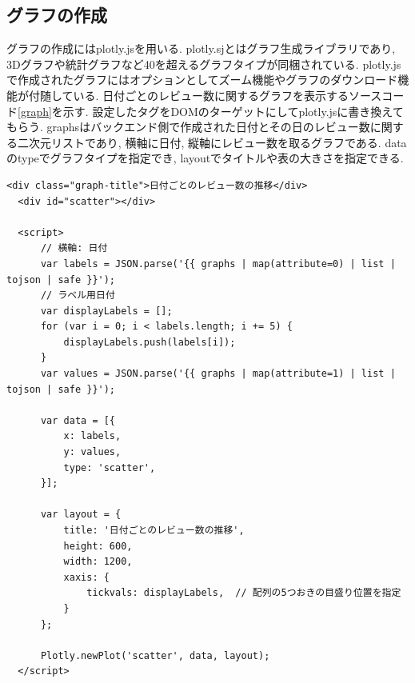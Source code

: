 \subsection{グラフの作成}
グラフの作成にはplotly.js\cite{plotly}を用いる. plotly.sjとはグラフ生成ライブラリであり, 3Dグラフや統計グラフなど40を超えるグラフタイプが同梱されている\cite{plotly}.
plotly.jsで作成されたグラフにはオプションとしてズーム機能やグラフのダウンロード機能が付随している. 
日付ごとのレビュー数に関するグラフを表示するソースコード\ref{graph}を示す. 設定したタグをDOMのターゲットにしてplotly.jsに書き換えてもらう. graphsはバックエンド側で作成された日付とその日のレビュー数に関する二次元リストであり, 横軸に日付, 縦軸にレビュー数を取るグラフである. 
dataのtypeでグラフタイプを指定でき, layoutでタイトルや表の大きさを指定できる. 

\begin{lstlisting}[caption=detail.html, label=graph]
  <div class="graph-title">日付ごとのレビュー数の推移</div>
  <div id="scatter"></div>

  <script>
      // 横軸: 日付
      var labels = JSON.parse('{{ graphs | map(attribute=0) | list | tojson | safe }}');
      // ラベル用日付
      var displayLabels = [];
      for (var i = 0; i < labels.length; i += 5) {
          displayLabels.push(labels[i]);
      }
      var values = JSON.parse('{{ graphs | map(attribute=1) | list | tojson | safe }}');

      var data = [{
          x: labels,
          y: values,
          type: 'scatter',
      }];

      var layout = {
          title: '日付ごとのレビュー数の推移',
          height: 600,
          width: 1200,
          xaxis: {
              tickvals: displayLabels,  // 配列の5つおきの目盛り位置を指定
          }
      };

      Plotly.newPlot('scatter', data, layout);
  </script>
\end{lstlisting}
